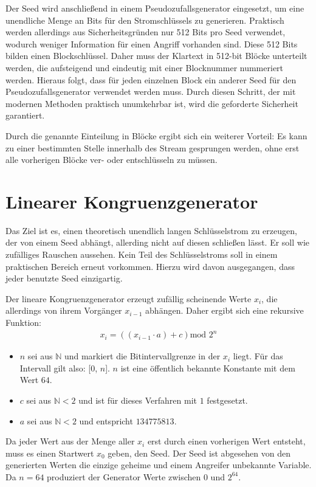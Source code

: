 \documentclass[10pt,a4paper]{article}
\begin{document}
\medskip
Der Seed wird anschließend in einem Pseudozufallsgenerator eingesetzt, um eine unendliche Menge an Bits für den Stromschlüssels zu generieren.
Praktisch werden allerdings aus Sicherheitsgründen nur 512 Bits pro Seed verwendet, wodurch weniger Information für einen Angriff vorhanden sind.
Diese 512 Bits bilden einen Blockschlüssel.
Daher muss der Klartext in 512-bit Blöcke unterteilt werden, die aufsteigend und eindeutig mit einer Blocknummer nummeriert werden.
Hieraus folgt, dass für jeden einzelnen Block ein anderer Seed für den Pseudozufallsgenerator verwendet werden muss.
Durch diesen Schritt, der mit modernen Methoden praktisch unumkehrbar ist, wird die geforderte Sicherheit garantiert.

Durch die genannte Einteilung in Blöcke ergibt sich ein weiterer Vorteil:
Es kann zu einer bestimmten Stelle innerhalb des Stream gesprungen werden, ohne erst alle vorherigen Blöcke ver- oder entschlüsseln zu müssen.

\section{Linearer Kongruenzgenerator}

Das Ziel ist es, einen theoretisch unendlich langen Schlüsselstrom zu erzeugen, der von einem Seed abhängt, allerding nicht auf diesen schließen lässt.
Er soll wie zufälliges Rauschen aussehen.
Kein Teil des Schlüsselstroms soll in einem praktischen Bereich erneut vorkommen.
Hierzu wird davon ausgegangen, dass jeder benutzte Seed einzigartig.

\medskip
Der lineare Kongruenzgenerator erzeugt zufällig scheinende Werte $x_i$, die allerdings von ihrem Vorgänger $x_{i-1}$ abhängen.
Daher ergibt sich eine rekursive Funktion:
\begin{align*}
    x_i = \left(\left(x_{i-1} \cdot a\right) + c\right) \text{mod } 2^n
\end{align*}
\begin{itemize}
    \item $n$ sei aus $\mathbb{N}$ und markiert die Bitintervallgrenze in der $x_i$ liegt.
          Für das Intervall gilt also: [0, $n$].
          $n$ ist eine öffentlich bekannte Konstante mit dem Wert $64$.
    \item $c$ sei aus $\mathbb{N}<2$ und ist für dieses Verfahren mit $1$ festgesetzt.
    \item $a$ sei aus $\mathbb{N}<2$ und entspricht $134775813$.
\end{itemize}
Da jeder Wert aus der Menge aller $x_i$ erst durch einen vorherigen Wert entsteht, muss es einen Startwert $x_0$ geben, den Seed.
Der Seed ist abgesehen von den generierten Werten die einzige geheime und einem Angreifer unbekannte Variable.
Da $n = 64$ produziert der Generator Werte zwischen $0$ und $2^{64}$.
\end{document}
